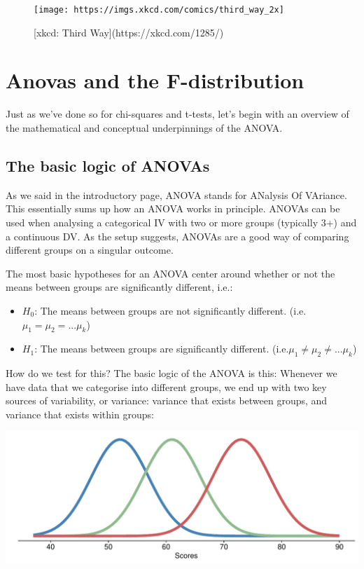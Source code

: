 \documentclass[
]{book}
\providecommand{\tightlist}{%
  \setlength{\itemsep}{0pt}\setlength{\parskip}{0pt}}
\begin{document}
\begin{figure}

{\centering \texttt{[image: https://imgs.xkcd.com/comics/third\_way\_2x]} 

}

\caption{[xkcd: Third Way](https://xkcd.com/1285/)}\label{fig:unnamed-chunk-164}
\end{figure}

\section{Anovas and the F-distribution}\label{anovas-and-the-f-distribution}

Just as we've done so for chi-squares and t-tests, let's begin with an
overview of the mathematical and conceptual underpinnings of the ANOVA.

\subsection{The basic logic of ANOVAs}\label{the-basic-logic-of-anovas}

As we said in the introductory page, ANOVA stands for ANalysis Of VAriance. This essentially sums up how an ANOVA works in principle. ANOVAs can be used when analysing a categorical IV with two or more groups (typically 3+) and a continuous DV. As the setup suggests, ANOVAs are a good way of comparing different groups on a singular outcome.

The most basic hypotheses for an ANOVA center around whether or not the
means between groups are significantly different, i.e.:

\begin{itemize}
\tightlist
\item
  \(H_0\): The means between groups are not significantly different.
  (i.e.~\(\mu_1 = \mu_2 = ... \mu_k\))
\item
  \(H_1\): The means between groups are significantly different.
  (i.e.\(\mu_1 \neq \mu_2 \neq ... \mu_k\))
\end{itemize}

How do we test for this? The basic logic of the ANOVA is this: Whenever
we have data that we categorise into different groups, we end up with
two key sources of variability, or variance: variance that exists
between groups, and variance that exists within groups:

\includegraphics{_main_files/figure-latex/unnamed-chunk-165-1.pdf}
\end{document}
